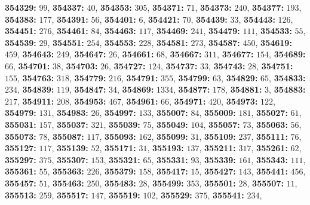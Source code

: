 \textsf{\bfseries 354329:} $99$, \textsf{\bfseries 354337:} $40$, \textsf{\bfseries 354353:} $305$, \textsf{\bfseries 354371:} $71$, \textsf{\bfseries 354373:} $240$, \textsf{\bfseries 354377:} $193$, \textsf{\bfseries 354383:} $177$, \textsf{\bfseries 354391:} $56$, \textsf{\bfseries 354401:} $6$, \textsf{\bfseries 354421:} $70$, \textsf{\bfseries 354439:} $33$, \textsf{\bfseries 354443:} $126$, \textsf{\bfseries 354451:} $276$, \textsf{\bfseries 354461:} $84$, \textsf{\bfseries 354463:} $117$, \textsf{\bfseries 354469:} $241$, \textsf{\bfseries 354479:} $111$, \textsf{\bfseries 354533:} $55$, \textsf{\bfseries 354539:} $29$, \textsf{\bfseries 354551:} $254$, \textsf{\bfseries 354553:} $228$, \textsf{\bfseries 354581:} $273$, \textsf{\bfseries 354587:} $450$, \textsf{\bfseries 354619:} $459$, \textsf{\bfseries 354643:} $249$, \textsf{\bfseries 354647:} $26$, \textsf{\bfseries 354661:} $68$, \textsf{\bfseries 354667:} $311$, \textsf{\bfseries 354677:} $154$, \textsf{\bfseries 354689:} $66$, \textsf{\bfseries 354701:} $38$, \textsf{\bfseries 354703:} $26$, \textsf{\bfseries 354727:} $124$, \textsf{\bfseries 354737:} $33$, \textsf{\bfseries 354743:} $28$, \textsf{\bfseries 354751:} $155$, \textsf{\bfseries 354763:} $318$, \textsf{\bfseries 354779:} $216$, \textsf{\bfseries 354791:} $355$, \textsf{\bfseries 354799:} $63$, \textsf{\bfseries 354829:} $65$, \textsf{\bfseries 354833:} $234$, \textsf{\bfseries 354839:} $119$, \textsf{\bfseries 354847:} $34$, \textsf{\bfseries 354869:} $1334$, \textsf{\bfseries 354877:} $178$, \textsf{\bfseries 354881:} $3$, \textsf{\bfseries 354883:} $217$, \textsf{\bfseries 354911:} $208$, \textsf{\bfseries 354953:} $467$, \textsf{\bfseries 354961:} $66$, \textsf{\bfseries 354971:} $420$, \textsf{\bfseries 354973:} $122$, \textsf{\bfseries 354979:} $131$, \textsf{\bfseries 354983:} $26$, \textsf{\bfseries 354997:} $133$, \textsf{\bfseries 355007:} $84$, \textsf{\bfseries 355009:} $181$, \textsf{\bfseries 355027:} $61$, \textsf{\bfseries 355031:} $157$, \textsf{\bfseries 355037:} $321$, \textsf{\bfseries 355039:} $75$, \textsf{\bfseries 355049:} $104$, \textsf{\bfseries 355057:} $73$, \textsf{\bfseries 355063:} $56$, \textsf{\bfseries 355073:} $78$, \textsf{\bfseries 355087:} $117$, \textsf{\bfseries 355093:} $162$, \textsf{\bfseries 355099:} $31$, \textsf{\bfseries 355109:} $237$, \textsf{\bfseries 355111:} $76$, \textsf{\bfseries 355127:} $117$, \textsf{\bfseries 355139:} $52$, \textsf{\bfseries 355171:} $31$, \textsf{\bfseries 355193:} $137$, \textsf{\bfseries 355211:} $317$, \textsf{\bfseries 355261:} $62$, \textsf{\bfseries 355297:} $375$, \textsf{\bfseries 355307:} $153$, \textsf{\bfseries 355321:} $65$, \textsf{\bfseries 355331:} $93$, \textsf{\bfseries 355339:} $161$, \textsf{\bfseries 355343:} $111$, \textsf{\bfseries 355361:} $55$, \textsf{\bfseries 355363:} $226$, \textsf{\bfseries 355379:} $158$, \textsf{\bfseries 355417:} $15$, \textsf{\bfseries 355427:} $143$, \textsf{\bfseries 355441:} $456$, \textsf{\bfseries 355457:} $51$, \textsf{\bfseries 355463:} $250$, \textsf{\bfseries 355483:} $28$, \textsf{\bfseries 355499:} $353$, \textsf{\bfseries 355501:} $28$, \textsf{\bfseries 355507:} $11$, \textsf{\bfseries 355513:} $259$, \textsf{\bfseries 355517:} $147$, \textsf{\bfseries 355519:} $102$, \textsf{\bfseries 355529:} $375$, \textsf{\bfseries 355541:} $234$, 
